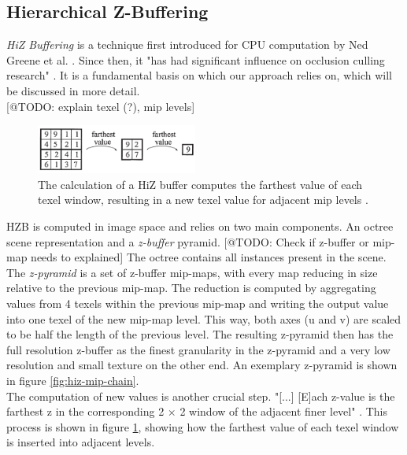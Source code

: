 \subsection{Hierarchical Z-Buffering} \label{subsec-hierarchical-z-buffering}

\emph{\ac{HiZ} Buffering} is a technique first introduced for \ac{CPU} computation by Ned Greene et al. 
\cite{Greene93,Greene95}. Since then, it "has had significant influence on occlusion culling research" 
\cite{AkenineMoeller2018}. It is a fundamental basis on which our approach relies on, which will be discussed 
in more detail.\\


[@TODO: explain texel (?), mip levels]
\begin{figure}[h]
    \centering
    \includegraphics[width=200px]{images/graphics/hiz-buf-values.png}
    \caption{The calculation of a \ac{HiZ} buffer computes the farthest value of each texel window, 
    resulting in a new texel value for adjacent mip levels \cite{AkenineMoeller2018}.}
    \label{fig:hiz-value-computation}
\end{figure}

\noindent
\ac{HZB} is computed in image space and relies on two main components. An octree scene representation and a 
\emph{z-buffer} pyramid. [@TODO: Check if z-buffer or mip-map needs to explained] 
The octree contains all instances present in the scene. The \emph{z-pyramid} is a set of z-buffer mip-maps, with every 
map reducing in size relative to the previous mip-map. The reduction is computed by aggregating values from 4 texels 
within the previous mip-map and writing the output value into one texel of the new mip-map level. This way, both axes 
(u and v) are scaled to be half the length of the previous level. The resulting z-pyramid then has the full resolution 
z-buffer as the finest granularity in the z-pyramid and a very low resolution and small texture on the other end. 
An exemplary z-pyramid is shown in figure \ref{fig:hiz-mip-chain}.\\

\noindent
The computation of new values is another crucial step. "[...] [E]ach z-value is the farthest z in the corresponding 
2 \begin{math}\times\end{math} 2 window of the adjacent finer level" \cite{AkenineMoeller2018}. This process is shown 
in figure \ref{fig:hiz-value-computation}, showing how the farthest value of each texel window is inserted into adjacent 
levels.\\

